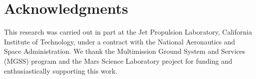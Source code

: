 \documentclass[letterpaper]{article} %
\begin{document}
\section{Acknowledgments}
This research was carried out in part at the Jet Propulsion Laboratory,
California Institute of Technology, under a contract with the National
Aeronautics and Space Administration.  
We thank the Multimission Ground System and Services (MGSS)
program and the Mars Science Laboratory project for funding and
enthusiastically supporting this work.


\end{document}
